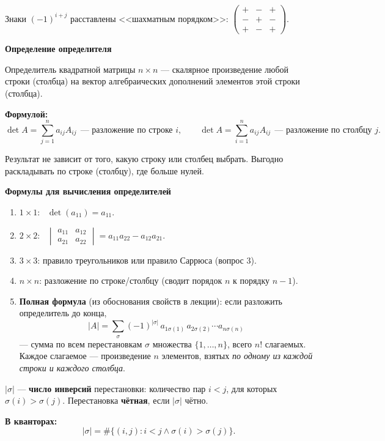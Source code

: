 \documentclass[a4paper,11pt]{article}
\newcommand{\kv}{\par\noindent\textbf{\textcolor{oprc!85!black}{В кванторах:}}}
\newcommand{\fm}{\par\noindent\textbf{\textcolor{oprc!85!black}{Формулой:}}}
\newcommand{\podr}[1]{\par\needspace{8\baselineskip}\medskip
  {\large\bfseries\textcolor{oprc!80!black}{#1}}\par\nopagebreak\smallskip}
\begin{document}
Знаки $(-1)^{i+j}$ расставлены <<шахматным порядком>>:
$\begin{pmatrix} + & - & + \\ - & + & - \\ + & - & + \end{pmatrix}$.

\podr{Определение определителя}

\begin{opr}[определитель]
Определитель квадратной матрицы $n \times n$ --- скалярное произведение любой строки (столбца) на вектор
алгебраических дополнений элементов этой строки (столбца).
\fm
\[
  \det A = \sum_{j=1}^{n} a_{ij} A_{ij} \ \ \text{--- разложение по строке } i, \qquad
  \det A = \sum_{i=1}^{n} a_{ij} A_{ij} \ \ \text{--- разложение по столбцу } j.
\]
\end{opr}

Результат не зависит от того, какую строку или столбец выбрать. Выгодно раскладывать по строке (столбцу), где больше нулей.

\podr{Формулы для вычисления определителей}

\begin{enumerate}[leftmargin=*]
  \item $1 \times 1$: \ $\det(a_{11}) = a_{11}$.
  \item $2 \times 2$: \ $\begin{vmatrix} a_{11} & a_{12} \\ a_{21} & a_{22} \end{vmatrix} = a_{11} a_{22} - a_{12} a_{21}$.
  \item $3 \times 3$: правило треугольников или правило Саррюса (вопрос 3).
  \item $n \times n$: разложение по строке/столбцу (сводит порядок $n$ к порядку $n - 1$).
  \item \textbf{Полная формула} (из обоснования свойств в лекции): если разложить определитель до конца,
    \[
      |A| = \sum_{\sigma} (-1)^{|\sigma|}\, a_{1\sigma(1)}\, a_{2\sigma(2)} \cdots a_{n\sigma(n)}
    \]
    --- сумма по всем перестановкам $\sigma$ множества $\{1, \dots, n\}$, всего $n!$ слагаемых.
    Каждое слагаемое --- произведение $n$ элементов, взятых \emph{по одному из каждой строки и каждого столбца}.
\end{enumerate}

\begin{opr}
$|\sigma|$ --- \textbf{число инверсий} перестановки: количество пар $i < j$, для которых $\sigma(i) > \sigma(j)$.
Перестановка \textbf{чётная}, если $|\sigma|$ чётно.
\kv
\[
  |\sigma| = \#\{(i, j) : i < j \wedge \sigma(i) > \sigma(j)\}.
\]
\end{opr}
\end{document}
